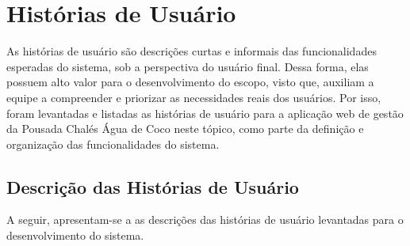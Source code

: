 \documentclass[
	12pt,				%
	openany,			%
	oneside,			%
	a4paper,			%
	english,			%
	french,				%
	spanish,			%
	brazil				%
	]{abntex2}
\begin{document}
\section{Histórias de Usuário}
As histórias de usuário são descrições curtas e informais das funcionalidades esperadas do sistema, sob a perspectiva do usuário final. Dessa forma, elas possuem alto valor para o desenvolvimento do escopo, visto que, auxiliam a equipe a compreender e priorizar as necessidades reais dos usuários. Por isso, foram levantadas e listadas as histórias de usuário para a aplicação web de gestão da Pousada Chalés Água de Coco neste tópico, como parte da definição e organização das funcionalidades do sistema.
\subsection{Descrição das Histórias de Usuário}
A seguir, apresentam-se a as descrições das histórias de usuário levantadas para o desenvolvimento do sistema.
\end{document}
